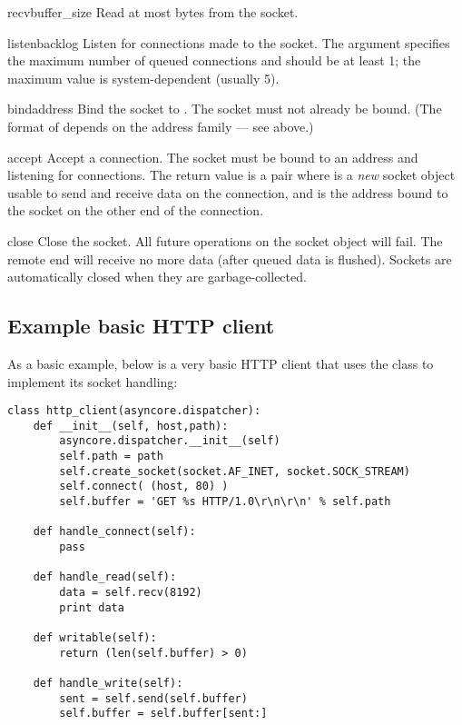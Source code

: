 \begin{methoddesc}{recv}{buffer_size}
  Read at most  bytes from the socket.
\end{methoddesc}

\begin{methoddesc}{listen}{backlog}
  Listen for connections made to the socket.  The 
  argument specifies the maximum number of queued connections
  and should be at least 1; the maximum value is
  system-dependent (usually 5).
\end{methoddesc}

\begin{methoddesc}{bind}{address}
  Bind the socket to .  The socket must not already
  be bound.  (The format of  depends on the address
  family --- see above.)
\end{methoddesc}

\begin{methoddesc}{accept}{}
  Accept a connection.  The socket must be bound to an address
  and listening for connections.  The return value is a pair
   where  is a
  \emph{new} socket object usable to send and receive data on
  the connection, and  is the address bound to the
  socket on the other end of the connection.
\end{methoddesc}

\begin{methoddesc}{close}{}
  Close the socket.  All future operations on the socket object
  will fail.  The remote end will receive no more data (after
  queued data is flushed).  Sockets are automatically closed
  when they are garbage-collected.
\end{methoddesc}


\subsection{Example basic HTTP client \label{asyncore-example}}

As a basic example, below is a very basic HTTP client that uses the 
 class to implement its socket handling:

\begin{verbatim}
class http_client(asyncore.dispatcher):
    def __init__(self, host,path):
        asyncore.dispatcher.__init__(self)
        self.path = path
        self.create_socket(socket.AF_INET, socket.SOCK_STREAM)
        self.connect( (host, 80) )
        self.buffer = 'GET %s HTTP/1.0\r\n\r\n' % self.path
        
    def handle_connect(self):
        pass
        
    def handle_read(self):
        data = self.recv(8192)
        print data
        
    def writable(self):
        return (len(self.buffer) > 0)
    
    def handle_write(self):
        sent = self.send(self.buffer)
        self.buffer = self.buffer[sent:]
\end{verbatim}
